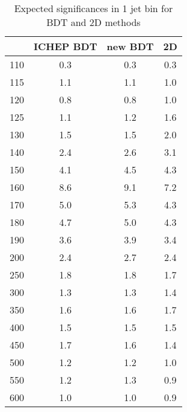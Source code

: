\begin{table}[!htb] 
	\centering
	\begin{tabular}{c | c c c }
   	\hline \hline
	\mHi & ICHEP BDT & new BDT & 2D \\
	\hline 
	110	&0.3	&0.3	&0.3 	\\
	115	&1.1	&1.1	&1.0 	\\
	120	&0.8	&0.8	&1.0	\\
	125	&1.1	&1.2	&1.6	\\
	130	&1.5	&1.5	&2.0	\\
	140	&2.4	&2.6	&3.1	\\
	150	&4.1	&4.5	&4.3	\\
	160	&8.6	&9.1	&7.2	\\
	170	&5.0	&5.3	&4.3	\\
	180	&4.7	&5.0	&4.3	\\
	190	&3.6	&3.9	&3.4	\\
	200	&2.4	&2.7	&2.4	\\
	250	&1.8	&1.8	&1.7	\\
	300	&1.3	&1.3	&1.4	\\
	350	&1.6	&1.6	&1.7	\\
	400	&1.5	&1.5	&1.5	\\
	450	&1.7	&1.6	&1.4	\\
	500	&1.2	&1.2	&1.0 	\\
	550	&1.2	&1.3	&0.9 	\\
	600	&1.0	&1.0	&0.9 	\\
   	\hline \hline
	\end{tabular}
	\label{tab:exp_sig_1j}
	\caption{Expected significances in 1 jet bin for BDT and 2D methods}
\end{table}

